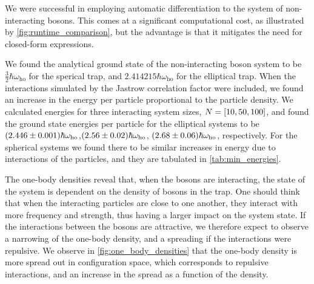 We were successful in employing automatic differentiation to the system of non-interacting bosons. This comes at a significant computational cost, as illustrated by \autoref{fig:runtime_comparison}, but the advantage is that it mitigates the need for closed-form expressions. 



We found the analytical ground state of the non-interacting boson system to be $\frac{3}{2}\hbar\omega_{\mathrm{ho}}$ for the sperical trap, and $2.414215\hbar\omega_{\mathrm{ho}}$ for the elliptical trap. When the interactions simulated by the Jastrow correlation factor were included, we found an increase in the energy per particle proportional to the particle density. We calculated energies for three interacting system sizes, $N=\qty[10, 50, 100]$, and found the ground state energies per particle for the elliptical systems to be $\qty(2.446\pm 0.001)\hbar\omega_{\mathrm{ho}}$,$\qty(2.56\pm 0.02)\hbar\omega_{\mathrm{ho}}$, $\qty(2.68\pm 0.06)\hbar\omega_{\mathrm{ho}}$, respectively. For the spherical systems we found there to be similar increases in energy due to interactions of the particles, and they are tabulated in \autoref{tab:min_energies}.

The one-body densities reveal that, when the bosons are interacting, the state of the system is dependent on the density of bosons in the trap. One should think that when the interacting particles are close to one another, they interact with more frequency and strength, thus having a larger impact on the system state. If the interactions between the bosons are attractive, we therefore expect to observe a narrowing of the one-body density, and a spreading if the interactions were repulsive. We observe in \autoref{fig:one_body_densities} that the one-body density is more spread out in configuration space, which corresponds to repulsive interactions, and an increase in the spread as a function of the density. 




